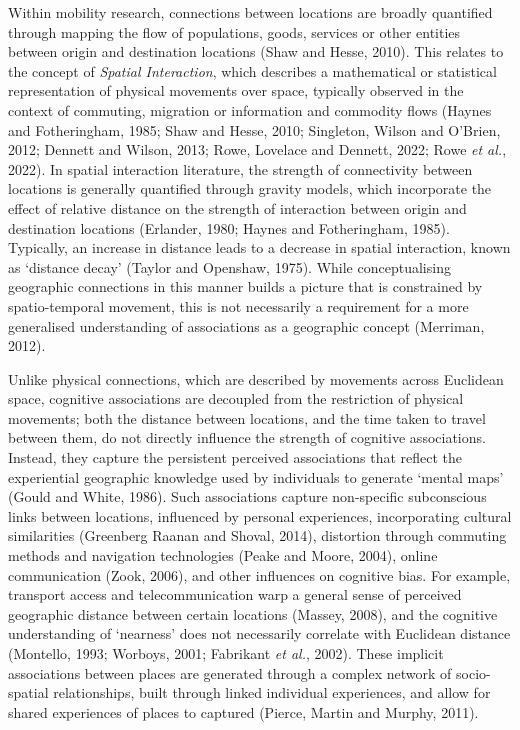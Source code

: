 \documentclass[
  letterpaper,
  11pt,
  english,
  onehalfspacing,
  headsepline]{MastersDoctoralThesis}
\begin{document}
Within mobility research, connections between locations are broadly
quantified through mapping the flow of populations, goods, services or
other entities between origin and destination locations (Shaw and Hesse,
2010). This relates to the concept of \emph{Spatial Interaction}, which
describes a mathematical or statistical representation of physical
movements over space, typically observed in the context of commuting,
migration or information and commodity flows (Haynes and Fotheringham,
1985; Shaw and Hesse, 2010; Singleton, Wilson and O'Brien, 2012; Dennett
and Wilson, 2013; Rowe, Lovelace and Dennett, 2022; Rowe \emph{et al.},
2022). In spatial interaction literature, the strength of connectivity
between locations is generally quantified through gravity models, which
incorporate the effect of relative distance on the strength of
interaction between origin and destination locations (Erlander, 1980;
Haynes and Fotheringham, 1985). Typically, an increase in distance leads
to a decrease in spatial interaction, known as `distance decay' (Taylor
and Openshaw, 1975). While conceptualising geographic connections in
this manner builds a picture that is constrained by spatio-temporal
movement, this is not necessarily a requirement for a more generalised
understanding of associations as a geographic concept (Merriman, 2012).

Unlike physical connections, which are described by movements across
Euclidean space, cognitive associations are decoupled from the
restriction of physical movements; both the distance between locations,
and the time taken to travel between them, do not directly influence the
strength of cognitive associations. Instead, they capture the persistent
perceived associations that reflect the experiential geographic
knowledge used by individuals to generate `mental maps' (Gould and
White, 1986). Such associations capture non-specific subconscious links
between locations, influenced by personal experiences, incorporating
cultural similarities (Greenberg Raanan and Shoval, 2014), distortion
through commuting methods and navigation technologies (Peake and Moore,
2004), online communication (Zook, 2006), and other influences on
cognitive bias. For example, transport access and telecommunication warp
a general sense of perceived geographic distance between certain
locations (Massey, 2008), and the cognitive understanding of `nearness'
does not necessarily correlate with Euclidean distance (Montello, 1993;
Worboys, 2001; Fabrikant \emph{et al.}, 2002). These implicit
associations between places are generated through a complex network of
socio-spatial relationships, built through linked individual
experiences, and allow for shared experiences of places to captured
(Pierce, Martin and Murphy, 2011).
\end{document}
